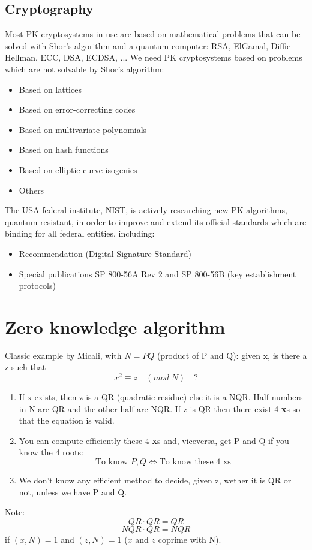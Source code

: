 \documentclass[a4paper, 10pt, titlepage]{article}
\begin{document}
\subsection{Cryptography}
Most PK cryptosystems in use are based on mathematical problems that can be solved with Shor's algorithm and a quantum computer: RSA, ElGamal, Diffie-Hellman, ECC, DSA, ECDSA, ...
We need PK cryptosystems based on problems which are not solvable by Shor's algorithm:
\begin{itemize}
\item Based on lattices
\item Based on error-correcting codes
\item Based on multivariate polynomials
\item Based on hash functions
\item Based on elliptic curve isogenies
\item Others
\end{itemize}
The USA federal institute, NIST, is actively researching new PK algorithms, quantum-resistant, in order to improve and extend its official standards which are binding for all federal entities, including:
\begin{itemize}
\item Recommendation (Digital Signature Standard)
\item Special publications SP 800-56A Rev 2 and SP 800-56B (key establishment protocols)
\end{itemize}

\newpage
\section{Zero knowledge algorithm}
Classic example by Micali, with $N=PQ$ (product of P and Q): given x, is there a z such that
$$x^2 \equiv z \quad (mod \; N) \quad ?$$
\begin{enumerate}
\item If x exists, then z is a QR (quadratic residue) else it is a NQR. Half numbers in N are QR and the other half are NQR. If z is QR then there exist 4 \textbf{x}s so that the equation is valid.
\item You can compute efficiently these 4 \textbf{x}s and, viceversa, get P and Q if you know the 4 roots:
$$\text{To know } P, Q \iff \text{To know these 4 xs}$$
\item We don't know any efficient method to decide, given z, wether it is QR or not, unless we have P and Q.
\end{enumerate}
Note: 
$$QR \cdot QR = QR$$
$$NQR \cdot QR = NQR$$
if $(x,N) = 1$ and $(z,N) = 1$ ($x$ and $z$ coprime with N).
\end{document}
